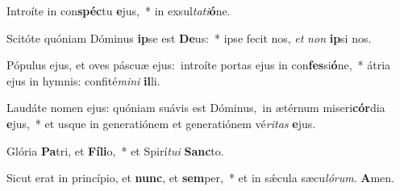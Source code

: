 Introíte in con\textbf{spéc}tu \textbf{e}jus,~* in exsul\textit{ta}\textit{ti}\textbf{ó}ne.

Scitóte quóniam Dóminus \textbf{ip}se est \textbf{De}us:~* ipse fecit nos, \textit{et} \textit{non} \textbf{ip}si nos.

Pópulus ejus, et oves páscuæ ejus:~\reddagger introíte portas ejus in con\textbf{fes}si\textbf{ó}ne,~* átria ejus in hymnis: confité\textit{mi}\textit{ni} \textbf{il}li.

Laudáte nomen ejus: quóniam suávis est Dóminus,~\reddagger in ætérnum miseri\textbf{cór}dia \textbf{e}jus,~* et usque in generatiónem et generatiónem vé\textit{ri}\textit{tas} \textbf{e}jus.

Glória \textbf{Pa}tri, et \textbf{Fí}\textbf{li}o,~* et Spirí\textit{tu}\textit{i} \textbf{Sanc}to.

Sicut erat in princípio, et \textbf{nunc}, et \textbf{sem}per,~* et in sǽcula sæcu\textit{ló}\textit{rum}. \textbf{A}men.


